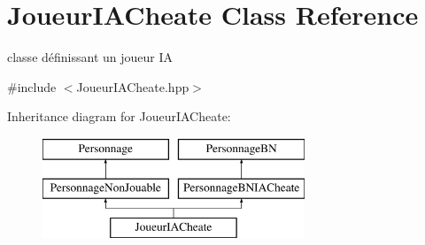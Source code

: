 \hypertarget{classJoueurIACheate}{\section{Joueur\-I\-A\-Cheate Class Reference}
\label{classJoueurIACheate}
}


classe définissant un joueur I\-A  




{\ttfamily \#include $<$Joueur\-I\-A\-Cheate.\-hpp$>$}

Inheritance diagram for Joueur\-I\-A\-Cheate\-:\begin{figure}[H]
\begin{center}
\leavevmode
\includegraphics[height=3.000000cm]{classJoueurIACheate}
\end{center}
\end{figure}
